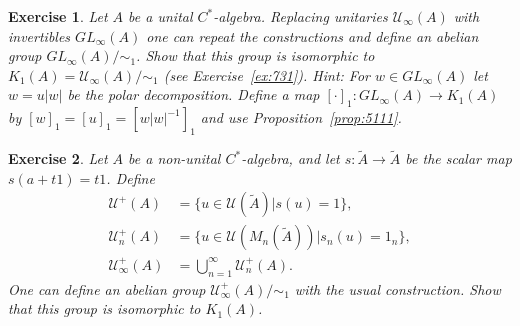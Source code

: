\documentclass{book}
\newtheorem{exercise}{Exercise}[section]
\def\cstar{\(C^*\)-algebra}
\begin{document}
\begin{exercise}\label{ex:736}
   Let \(A\) be a unital \cstar. Replacing unitaries \(\mathcal{U}_\infty(A)\) with invertibles
  \(GL_\infty(A)\) one can repeat the constructions and define an abelian group
  \(GL_\infty(A)/\sim_1\). Show that this group is isomorphic to \(K_1(A) = \mathcal{U}_\infty(A)/\sim_1\) 
  (see Exercise~\ref{ex:731}). Hint: For \(w \in GL_\infty(A)\) let \(w = u|w|\) be the polar decomposition. Define a map
  \({[\cdot]}_1 : GL_\infty(A) \rightarrow K_1(A)\) by \({[w]}_1 = {[u]}_1 = {[w|w|^{-1}]}_1\) and use Proposition~\ref{prop:5111}.
\end{exercise}

\begin{exercise}\label{ex:737}
  Let \(A\) be a non-unital \cstar, and let \(s:\tilde{A}\rightarrow\tilde{A}\) be the scalar map
  \(s(a+t1)=t1\). Define
  \begin{align*}
    \mathcal{U}^+(A)&=\{u\in\mathcal{U}(\tilde{A})| s(u)=1\},\\
    \mathcal{U}^+_n(A)&=\{u\in\mathcal{U}(M_n(\tilde{A}))| s_n(u)=1_n\},\\
    \mathcal{U}^+_\infty(A)&=\bigcup_{n=1}^\infty \mathcal{U}_n^+(A).
  \end{align*}
  One can define an abelian group \(\mathcal{U}^+_\infty(A)/\sim_1\) with the usual construction. Show that this group is isomorphic to \(K_1(A)\).
\end{exercise}
\end{document}
